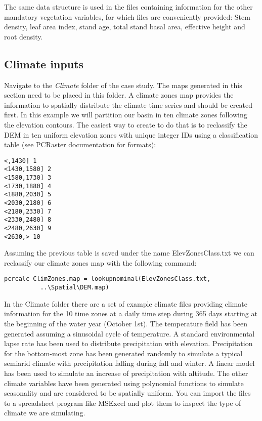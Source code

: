 The same data structure is used in the files containing information for the other mandatory vegetation variables, for which files are conveniently provided: Stem density, leaf area index, stand age, total stand basal area, effective height and root density.

 
\subsection{Climate inputs} 

Navigate to the \textit{Climate} folder of the case study. The maps generated in this section need to be placed in this folder. A climate zones map provides the information to spatially distribute the climate time series and should be created first. In this example we will partition our basin in ten climate zones following the elevation contours. The easiest way to create to do that is to reclassify the DEM in ten uniform elevation zones with unique integer IDs using a classification table (see PCRaster documentation for formats):

\begin{verbatim}
<,1430] 1
<1430,1580] 2
<1580,1730] 3
<1730,1880] 4
<1880,2030] 5
<2030,2180] 6
<2180,2330] 7
<2330,2480] 8
<2480,2630] 9
<2630,> 10
\end{verbatim}

Assuming the previous table is saved under the name \textsf{ElevZonesClass.txt} we can reclassify our climate zones map with the following command:

\begin{verbatim}
pcrcalc ClimZones.map = lookupnominal(ElevZonesClass.txt,
          ..\Spatial\DEM.map)
\end{verbatim}
 
 In the \textsf{Climate} folder there are a set of example climate files providing climate information for the 10 time zones at a daily time step during 365 days starting at the beginning of the water year (October 1st). The temperature field has been generated assuming a sinusoidal cycle of temperature. A standard environmental lapse rate has been used to distribute precipitation with elevation. Precipitation for the bottom-most zone has been generated randomly to simulate a typical semiarid climate with precipitation falling during fall and winter. A linear model has been used to simulate an increase of precipitation with altitude. The other climate variables have been generated using polynomial functions to simulate seasonality and are considered to be spatially uniform. You can import the files to a spreadsheet program like MSExcel and plot them to inspect the type of climate we are simulating. 


